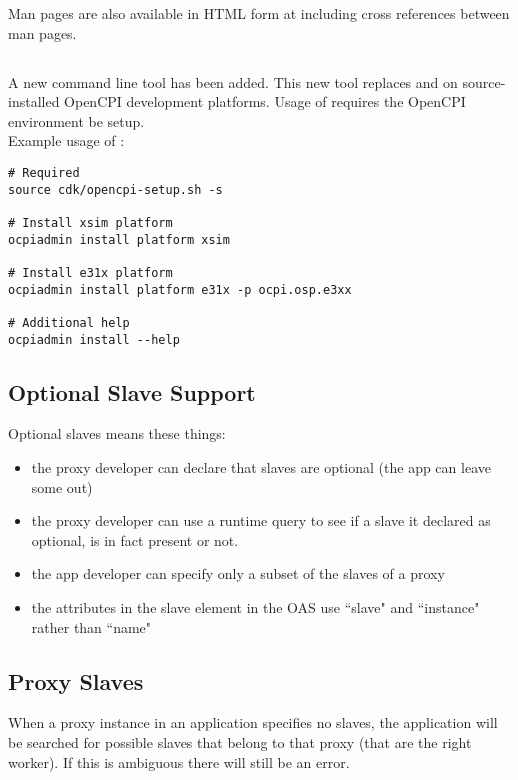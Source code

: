 Man pages are also available in HTML form at  including cross references between man pages.

\subsection{}
\label{sec:20_ocpiadmin}
A new command line tool  has been added. This new tool replaces  and  on source-installed OpenCPI development platforms. Usage of  requires the OpenCPI environment be setup.\\
Example usage of :
\begin{lstlisting}
# Required
source cdk/opencpi-setup.sh -s

# Install xsim platform
ocpiadmin install platform xsim

# Install e31x platform
ocpiadmin install platform e31x -p ocpi.osp.e3xx

# Additional help
ocpiadmin install --help
\end{lstlisting}

\subsection{Optional Slave Support}
\label{sec:20_optional_slave_support}
Optional slaves means these things:
\begin{itemize}
\item the proxy developer can declare that slaves are optional (the app can leave some out)
\item the proxy developer can use a runtime query to see if a slave it declared as optional, is in fact present or not.
\item the app developer can specify only a subset of the slaves of a proxy
\item the attributes in the slave element in the OAS use ``slave" and ``instance" rather than ``name"
\end{itemize}

\subsection{Proxy Slaves}
\label{sec:20_proxy_slaves}
When a proxy instance in an application specifies no slaves, the application will be searched for possible slaves that belong to that proxy (that are the right worker).  If this is ambiguous there will still be an error.

